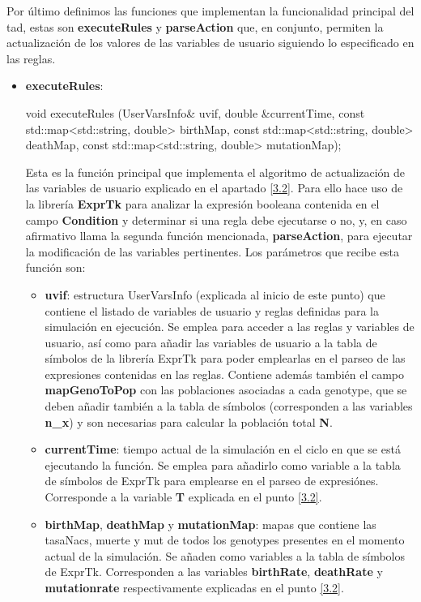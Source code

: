 Por último definimos las funciones que  implementan la funcionalidad principal del \gls{tad}, estas son \textbf{executeRules} y \textbf{parseAction} que, en conjunto, permiten la actualización de los valores de las variables de usuario siguiendo lo especificado en las reglas.
\begin{itemize}
	\item \textbf{executeRules}:
	\begin{CPP}
	void executeRules (UserVarsInfo& uvif,
	                    double &currentTime,
	                    const std::map<std::string, double> birthMap,
	                    const std::map<std::string, double> deathMap,
	                    const std::map<std::string, double> mutationMap);
	\end{CPP}
Esta es la función principal que implementa el algoritmo de actualización de las variables de usuario explicado en el apartado \ref{3.2}. Para ello hace uso de la librería \textbf{ExprTk}\cite{Exprtk} para analizar la expresión booleana contenida en el campo \textbf{Condition} y determinar si una regla debe ejecutarse o no, y, en caso afirmativo llama  la segunda función mencionada, \textbf{parseAction}, para ejecutar la modificación de las variables pertinentes.
Los parámetros que recibe esta función son:
	\begin{itemize}
		\item \textbf{uvif}: estructura UserVarsInfo (explicada al inicio de este punto) que contiene el listado de variables de usuario y reglas definidas para la simulación en ejecución. Se emplea para acceder a las reglas y variables de usuario, así como para añadir las variables de usuario a la tabla de símbolos de la librería ExprTk para poder emplearlas en el parseo de las expresiones contenidas en las reglas. Contiene además también el campo \textbf{mapGenoToPop} con las poblaciones asociadas a cada \gls{genotype}, que se deben añadir también a la tabla de símbolos (corresponden a las variables \textbf{n\_x}) y son necesarias para calcular la población total \textbf{N}.
		\item \textbf{currentTime}: tiempo actual de la simulación en el ciclo en que se está  ejecutando la función. Se emplea para añadirlo como variable a la tabla de símbolos de ExprTk para emplearse en el parseo de expresiónes. Corresponde a la variable \textbf{T} explicada en el punto \ref{3.2}.
		\item \textbf{birthMap}, \textbf{deathMap} y \textbf{mutationMap}: mapas que contiene las \glspl{tasaNac}, muerte y \gls{mut} de todos los \glspl{genotype} presentes en el momento actual de la simulación. Se añaden como variables a la tabla de símbolos de ExprTk. Corresponden a las variables \textbf{birthRate}, \textbf{deathRate} y \textbf{mutationrate} respectivamente explicadas en el punto \ref{3.2}.

\end{itemize}
\end{itemize}
